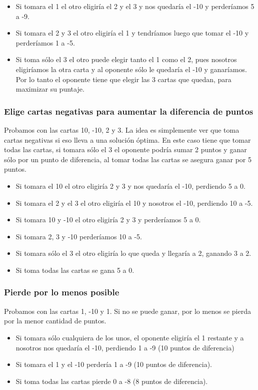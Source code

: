 \begin{itemize}
   \item Si tomara el 1 el otro eligiría el 2 y el 3 y nos quedaría el -10 y perderíamos 5 a -9.
   \item Si tomara el 2 y 3 el otro eligiría el 1 y tendríamos luego que tomar el -10 y perderíamos 1 a -5.
   \item Si toma sólo el 3 el otro puede elegir tanto el 1 como el 2, pues nosotros eligiríamos la otra carta
      y al oponente sólo le quedaría el -10 y ganaríamos. Por lo tanto el oponente tiene que elegir las 3 cartas
      que quedan, para maximizar su puntaje.
\end{itemize}

\subsubsection{Elige cartas negativas para aumentar la diferencia de puntos}
Probamos con las cartas 10, -10, 2 y 3. La idea es simplemente ver que toma cartas negativas si
eso lleva a una solución óptima. En este caso tiene que tomar todas las cartas, si tomara sólo el 3 el oponente podría sumar
2 puntos y ganar sólo por un punto de diferencia, al tomar todas las cartas se asegura ganar por 5 puntos.

\begin{itemize}
   \item Si tomara el 10 el otro eligiría 2 y 3 y nos quedaría el -10, perdiendo 5 a 0.
   \item Si tomara el 2 y el 3 el otro eligiría el 10 y nosotros el -10, perdiendo 10 a -5.
   \item Si tomara 10 y -10 el otro eligiría 2 y 3 y perderíamos 5 a 0.
   \item Si tomara 2, 3 y -10 perderíamos 10 a -5.
   \item Si tomara sólo el 3 el otro eligiría lo que queda y llegaría a 2, ganando 3 a 2.
   \item Si toma todas las cartas se gana 5 a 0.
\end{itemize}

\subsubsection{Pierde por lo menos posible}
Probamos con las cartas 1, -10 y 1. Si no se puede ganar, por lo menos se pierda por la menor cantidad de puntos.

\begin{itemize}
   \item Si tomara sólo cualquiera de los unos, el oponente eligiría el 1 restante y a nosotros nos quedaría el -10,
      perdiendo 1 a -9 (10 puntos de diferencia)
   \item Si tomara el 1 y el -10 perdería 1 a -9 (10 puntos de diferencia).
   \item Si toma todas las cartas pierde 0 a -8 (8 puntos de diferencia).
\end{itemize}

